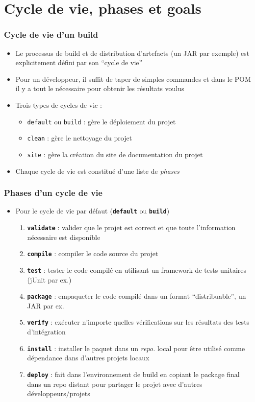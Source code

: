 \documentclass{beamer}
\begin{document}
\section{Cycle de vie, phases et goals}
\begin{frame}[fragile]
  \frametitle{Cycle de vie d'un build}
\begin{itemize}
\item Le processus de build et de distribution d'artefacts (un JAR par
  exemple) est explicitement défini par son ``cycle de vie''
\item Pour un développeur, il suffit de taper de simples commandes et
  dans le POM il y a tout le nécessaire pour obtenir les résultats voulus
\item Trois types de cycles de vie :
  \begin{itemize}
  \item \texttt{default} ou \texttt{build} : gère le déploiement du
    projet
  \item \texttt{clean} : gère le nettoyage du projet
  \item \texttt{site} : gère la création du site de documentation du projet
  \end{itemize}
\item Chaque cycle de vie est constitué d'une liste de \textit{phases}
\end{itemize}
\end{frame}

\begin{frame}[fragile]
  \frametitle{Phases d'un cycle de vie}
\begin{itemize}
\item  Pour le cycle de vie par défaut (\textbf{\texttt{default}} ou \textbf{\texttt{build}})
  \begin{enumerate}
  \item \textbf{\texttt{validate}} : valider que le projet est correct et que
    toute l'information nécessaire est disponible
  \item \textbf{\texttt{compile}} : compiler le code source du projet
  \item \textbf{\texttt{test}} : tester le code compilé en utilisant un
    framework de tests unitaires (jUnit par ex.)
  \item \textbf{\texttt{package}} : empaqueter le code compilé dans un format
    ``distribuable'', un JAR par ex.
  \item \textbf{\texttt{verify}} : exécuter n'importe quelles vérifications sur
    les résultats des tests d'intégration
  \item \textbf{\texttt{install}} : installer le paquet dans un \textit{repo.}
    local pour être utilisé comme dépendance dans d'autres projets
    locaux
  \item \textbf{\texttt{deploy}} : fait dans l'environnement de build en
    copiant le package final dans un repo distant pour partager le
    projet avec d'autres développeurs/projets
  \end{enumerate}
\end{itemize}
\end{frame}
\end{document}

